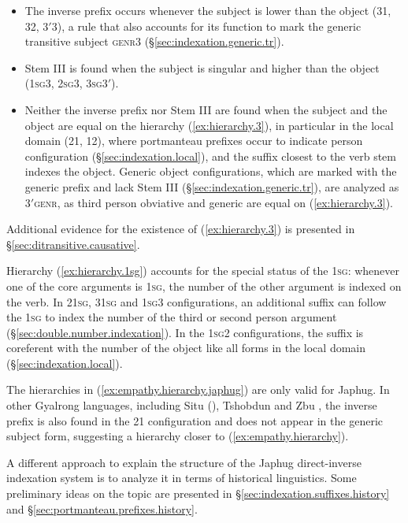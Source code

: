 \begin{itemize}
\item The inverse prefix occurs whenever the subject is lower than the object (3\fl{}1, 3\fl{}2, 3$'$\fl{}3), a rule that also accounts for its function to mark the generic transitive subject \textsc{genr}\fl{}3 (§\ref{sec:indexation.generic.tr}). 
\item Stem III is found when the subject is singular and higher than the object (\textsc{1sg}\fl{}3, \textsc{2sg}\fl{}3, \textsc{3sg}\fl{}3$'$). 
\item Neither the inverse prefix nor Stem III are found when the subject and the object are equal on the hierarchy (\ref{ex:hierarchy.3}), in particular in the local domain (2\fl{}1, 1\fl{}2), where portmanteau prefixes occur to indicate person configuration (§\ref{sec:indexation.local}), and the suffix closest to the verb stem indexes the object. Generic object configurations, which are marked with the  generic prefix and lack Stem III (§\ref{sec:indexation.generic.tr}), 
are analyzed as 3$'$\fl{}\textsc{genr}, as third person obviative and generic are equal on (\ref{ex:hierarchy.3}).
\end{itemize}

Additional evidence for the existence of (\ref{ex:hierarchy.3}) is presented in §\ref{sec:ditransitive.causative}.

Hierarchy (\ref{ex:hierarchy.1sg}) accounts for the special status of the \textsc{1sg}: whenever one of the core arguments is \textsc{1sg}, the number of the other argument is indexed on the verb. In 2\fl{}\textsc{1sg}, 3\fl{}\textsc{1sg} and \textsc{1sg}\fl{}3 configurations, an additional suffix can follow the  \textsc{1sg} to index the number of the third or second person argument (§\ref{sec:double.number.indexation}). In the \textsc{1sg}\fl{}2 configurations, the suffix is coreferent with the number of the object like all forms in the local domain (§\ref{sec:indexation.local}). 

The hierarchies in (\ref{ex:empathy.hierarchy.japhug}) are only valid for Japhug. In other Gyalrong languages, including Situ (\citealt{delancey81direction, jackson15sastod, zhangsy19obviative}), Tshobdun \citep{jackson02rentongdengdi} and Zbu \citep{gongxun14agreement}, the inverse prefix is also found in the 2\fl{}1 configuration and does not appear in the generic subject form, suggesting a hierarchy closer to (\ref{ex:empathy.hierarchy}).

A different approach to explain the structure of the Japhug direct-inverse indexation system is to analyze it in terms of historical linguistics. Some preliminary ideas on the topic are presented in §\ref{sec:indexation.suffixes.history} and §\ref{sec:portmanteau.prefixes.history}.




